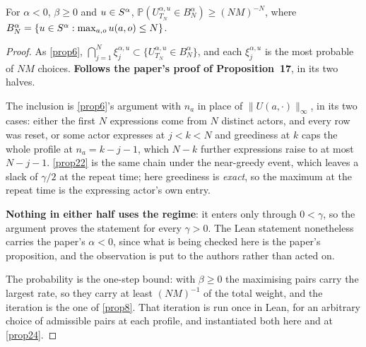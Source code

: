 \begin{proposition}
  \label{prop17}
  \leanok
  For $\alpha < 0$, $\beta \ge 0$ and $u \in S^\alpha$,
  $\mathbb{P}(U^{\alpha,u}_{T_N} \in B_N^\alpha) \ge (NM)^{-N}$, where
  $B_N^\alpha = \{ u \in S^\alpha : \max_{a,o} u(a,o) \le N \}$.
\end{proposition}
\begin{proof}
  \leanok
  As \ref{prop6}, $\bigcap_{j=1}^N \xi_j^{\alpha,u} \subset
  \{U^{\alpha,u}_{T_N} \in B_N^\alpha\}$, and each $\xi_j^{\alpha,u}$ is the
  most probable of $NM$ choices. \textbf{Follows the paper's proof of
  Proposition~17}, in its two halves.

  The inclusion is \ref{prop6}'s argument with $n_a$ in place of
  $\|U(a,\cdot)\|_\infty$, in its two cases: either the first $N$ expressions
  come from $N$ distinct actors, and every row was reset, or some actor
  expresses at $j < k < N$ and greediness at $k$ caps the whole profile at $n_a
  = k-j-1$, which $N-k$ further expressions raise to at most $N-j-1$.
  \ref{prop22} is the same chain under the near-greedy event, which leaves a
  slack of $\gamma/2$ at the repeat time; here greediness is \emph{exact}, so
  the maximum at the repeat time is the expressing actor's own entry.

  \textbf{Nothing in either half uses the regime}: it enters only through
  $0 < \gamma$, so the argument proves the statement for every $\gamma > 0$.
  The Lean statement nonetheless carries the paper's $\alpha < 0$, since what is
  being checked here is the paper's proposition, and the observation is put to
  the authors rather than acted on.

  The probability is the one-step bound: with $\beta \ge 0$ the maximising
  pairs carry the largest rate, so they carry at least $(NM)^{-1}$ of the total
  weight, and the iteration is the one of \ref{prop8}.  That iteration is run
  once in Lean, for an arbitrary choice of admissible pairs at each profile,
  and instantiated both here and at \ref{prop24}.
\end{proof}

